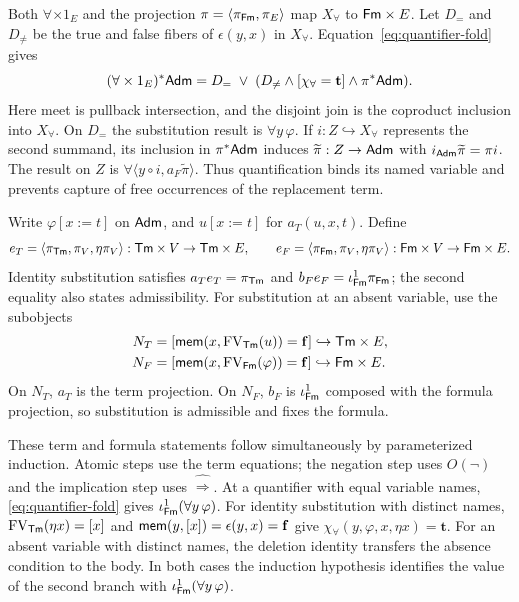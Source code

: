 Both $\forall\times1_E$ and the projection
$\pi=\langle\pi_{\mathsf{Fm}},\pi_E\rangle$ map $X_{\forall}$ to $\mathsf{Fm}\times E$.
Let $D_=$ and $D_{\ne}$ be the true and false fibers of $\epsilon(y,x)$
in $X_{\forall}$. Equation~\eqref{eq:quantifier-fold} gives
\begin{equation}\label{eq:admissibility-subobjects}
 (\forall\times1_E)^*\mathsf{Adm}=D_=\;\vee\;
    (D_{\ne}\wedge [\chi_{\forall}=\mathbf{t}]\wedge \pi^*\mathsf{Adm}).
\end{equation}
Here meet is pullback intersection, and the disjoint join is the
coproduct inclusion into $X_{\forall}$. On $D_=$ the substitution
result is $\forall y\,\varphi$. If $i:Z\hookrightarrow X_{\forall}$
represents the second summand, its inclusion in $\pi^*\mathsf{Adm}$ induces
$\widetilde\pi:Z\to\mathsf{Adm}$ with $i_{\mathsf{Adm}}\widetilde\pi=\pi i$.
The result on $Z$ is $\forall\langle y\circ i,a_F\widetilde\pi\rangle$.
Thus quantification binds its named variable and prevents capture
of free occurrences of the replacement term.

Write $\varphi[x:=t]$ on $\mathsf{Adm}$, and $u[x:=t]$ for
$a_T(u,x,t)$. Define
\[
 e_T=\langle\pi_{\mathsf{Tm}},\pi_V,\eta\pi_V\rangle:
          \mathsf{Tm}\times V\to\mathsf{Tm}\times E,
 \qquad
 e_F=\langle\pi_{\mathsf{Fm}},\pi_V,\eta\pi_V\rangle:
          \mathsf{Fm}\times V\to\mathsf{Fm}\times E.
\]
Identity substitution satisfies $a_Te_T=\pi_{\mathsf{Tm}}$ and
$b_Fe_F=\iota^{1}_{\mathsf{Fm}}\pi_{\mathsf{Fm}}$; the second equality also states
admissibility. For substitution at
an absent variable, use the subobjects
\begin{align*}
 N_T&=[\mathsf{mem}(x,\operatorname{FV}_{\mathsf{Tm}}(u))=\mathbf{f}]
                            \hookrightarrow\mathsf{Tm}\times E,\\
 N_F&=[\mathsf{mem}(x,\operatorname{FV}_{\mathsf{Fm}}(\varphi))=\mathbf{f}]
                            \hookrightarrow\mathsf{Fm}\times E.
\end{align*}
On $N_T$, $a_T$ is the term projection. On $N_F$, $b_F$ is
$\iota^{1}_{\mathsf{Fm}}$ composed with the formula projection, so substitution
is admissible and fixes the formula.

These term and formula statements follow simultaneously by
parameterized induction. Atomic steps use the term equations;
the negation step uses $O(\neg)$ and the implication step uses
$\widehat{\Rightarrow}$. At a quantifier with equal variable names,
\eqref{eq:quantifier-fold} gives $\iota^{1}_{\mathsf{Fm}}(\forall y\,\varphi)$.
For identity substitution with distinct names,
$\operatorname{FV}_{\mathsf{Tm}}(\eta x)=[x]$ and $\mathsf{mem}(y,[x])=\epsilon(y,x)=\mathbf f$ give
$\chi_{\forall}(y,\varphi,x,\eta x)=\mathbf t$.
For an absent variable with distinct names, the deletion identity
transfers the absence condition to the body. In both cases the
induction hypothesis identifies the value of the second branch with
$\iota^{1}_{\mathsf{Fm}}(\forall y\,\varphi)$.

